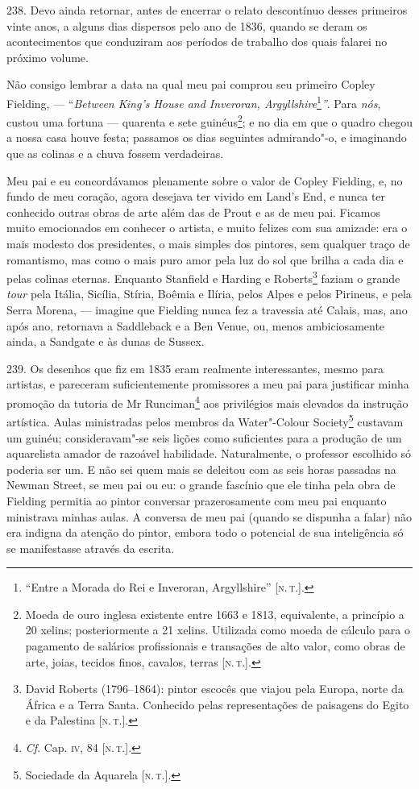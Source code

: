 238. Devo ainda retornar, antes de encerrar o relato descontínuo desses
primeiros vinte anos, a alguns dias dispersos pelo ano de 1836, quando
se deram os acontecimentos que conduziram aos períodos de trabalho dos
quais falarei no próximo volume.

Não consigo lembrar a data na qual meu pai comprou seu primeiro Copley
Fielding, --- ``\emph{Between King's House and Inveroran,
Argyllshire}\footnote{``Entre a Morada do Rei e Inveroran, Argyllshire''
  {[}\textsc{n.\,t.}{]}.}\emph{''}. Para \emph{nós}, custou uma fortuna ---
quarenta e sete guinéus\footnote{Moeda de ouro inglesa existente entre
  1663 e 1813, equivalente, a princípio a 20 xelins; posteriormente a 21
  xelins. Utilizada como moeda de cálculo para o pagamento de salários
  profissionais e transações de alto valor, como obras de arte, joias,
  tecidos finos, cavalos, terras {[}\textsc{n.\,t.}{]}.}; e no dia em que o
quadro chegou a nossa casa houve festa; passamos os dias seguintes
admirando"-o, e imaginando que as colinas e a chuva fossem verdadeiras.

Meu pai e eu concordávamos plenamente sobre o valor de Copley Fielding,
e, no fundo de meu coração, agora desejava ter vivido em Land's End, e
nunca ter conhecido outras obras de arte além das de Prout e as de meu
pai. Ficamos muito emocionados em conhecer o artista, e muito felizes
com sua amizade: era o mais modesto dos presidentes, o mais simples dos
pintores, sem qualquer traço de romantismo, mas como o mais puro amor
pela luz do sol que brilha a cada dia e pelas colinas eternas. Enquanto
Stanfield e Harding e Roberts\footnote{David Roberts (1796--1864): pintor
  escocês que viajou pela Europa, norte da África e a Terra Santa.
  Conhecido pelas representações de paisagens do Egito e da Palestina
  {[}\textsc{n.\,t.}{]}.} faziam o grande \emph{tour} pela Itália, Sicília,
Stíria, Boêmia e Ilíria, pelos Alpes e pelos Pirineus, e pela Serra
Morena, --- imagine que Fielding nunca fez a travessia até Calais, mas,
ano após ano, retornava a Saddleback e a Ben Venue, ou, menos
ambiciosamente ainda, a Sandgate e às dunas de Sussex.

239. Os desenhos que fiz em 1835 eram realmente interessantes, mesmo
para artistas, e pareceram suficientemente promissores a meu pai para
justificar minha promoção da tutoria de Mr Runciman\footnote{\emph{Cf}.
  Cap. \textsc{iv}, 84 {[}\textsc{n.\,t.}{]}.} aos privilégios mais elevados da instrução
artística. Aulas ministradas pelos membros da Water"-Colour
Society\footnote{Sociedade da Aquarela {[}\textsc{n.\,t.}{]}.} custavam um
guinéu; consideravam"-se seis lições como suficientes para a produção de
um aquarelista amador de razoável habilidade. Naturalmente, o professor
escolhido só poderia ser um. E não sei quem mais se deleitou com as seis
horas passadas na Newman Street, se meu pai ou eu: o grande fascínio que
ele tinha pela obra de Fielding permitia ao pintor conversar
prazerosamente com meu pai enquanto ministrava minhas aulas. A conversa
de meu pai (quando se dispunha a falar) não era indigna da atenção do
pintor, embora todo o potencial de sua inteligência só se manifestasse
através da escrita.

